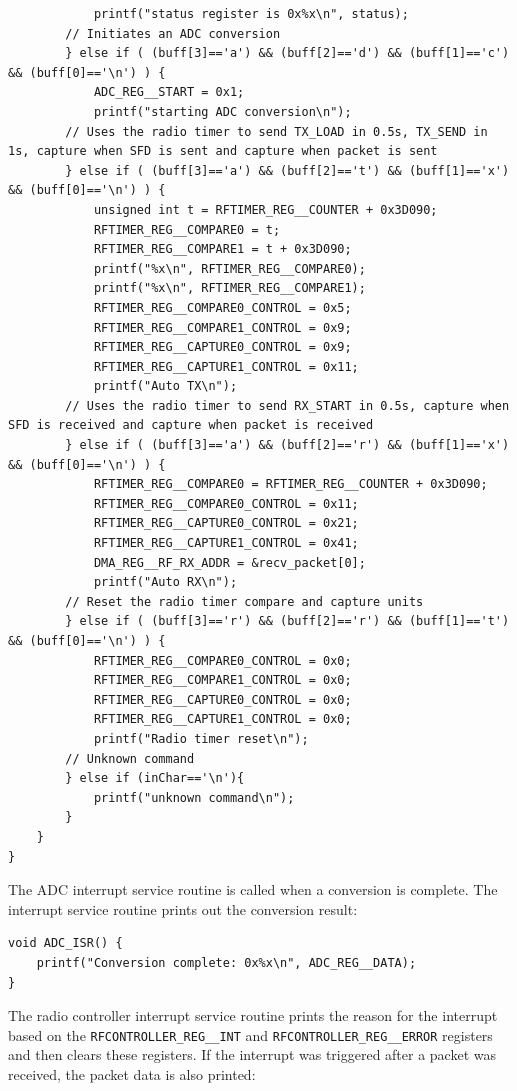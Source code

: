 \begin{lstlisting}
            printf("status register is 0x%x\n", status);	
        // Initiates an ADC conversion
        } else if ( (buff[3]=='a') && (buff[2]=='d') && (buff[1]=='c') && (buff[0]=='\n') ) {
            ADC_REG__START = 0x1;
            printf("starting ADC conversion\n");
        // Uses the radio timer to send TX_LOAD in 0.5s, TX_SEND in 1s, capture when SFD is sent and capture when packet is sent
        } else if ( (buff[3]=='a') && (buff[2]=='t') && (buff[1]=='x') && (buff[0]=='\n') ) {
            unsigned int t = RFTIMER_REG__COUNTER + 0x3D090;
            RFTIMER_REG__COMPARE0 = t;
            RFTIMER_REG__COMPARE1 = t + 0x3D090;
            printf("%x\n", RFTIMER_REG__COMPARE0);
            printf("%x\n", RFTIMER_REG__COMPARE1);
            RFTIMER_REG__COMPARE0_CONTROL = 0x5;
            RFTIMER_REG__COMPARE1_CONTROL = 0x9;
            RFTIMER_REG__CAPTURE0_CONTROL = 0x9;
            RFTIMER_REG__CAPTURE1_CONTROL = 0x11;
            printf("Auto TX\n");
        // Uses the radio timer to send RX_START in 0.5s, capture when SFD is received and capture when packet is received
        } else if ( (buff[3]=='a') && (buff[2]=='r') && (buff[1]=='x') && (buff[0]=='\n') ) {
            RFTIMER_REG__COMPARE0 = RFTIMER_REG__COUNTER + 0x3D090;
            RFTIMER_REG__COMPARE0_CONTROL = 0x11;
            RFTIMER_REG__CAPTURE0_CONTROL = 0x21;
            RFTIMER_REG__CAPTURE1_CONTROL = 0x41;
            DMA_REG__RF_RX_ADDR = &recv_packet[0];
            printf("Auto RX\n");
        // Reset the radio timer compare and capture units
        } else if ( (buff[3]=='r') && (buff[2]=='r') && (buff[1]=='t') && (buff[0]=='\n') ) {
            RFTIMER_REG__COMPARE0_CONTROL = 0x0;
            RFTIMER_REG__COMPARE1_CONTROL = 0x0;
            RFTIMER_REG__CAPTURE0_CONTROL = 0x0;
            RFTIMER_REG__CAPTURE1_CONTROL = 0x0;
            printf("Radio timer reset\n");
        // Unknown command
        } else if (inChar=='\n'){	
            printf("unknown command\n");		
        }
    }
}
\end{lstlisting}

The ADC interrupt service routine is called when a conversion is complete. The interrupt service routine prints out the conversion result:

\begin{lstlisting}
void ADC_ISR() {
    printf("Conversion complete: 0x%x\n", ADC_REG__DATA);
}
\end{lstlisting}

The radio controller interrupt service routine prints the reason for the interrupt based on the \texttt{RFCONTROLLER\_REG\_\_INT} and \texttt{RFCONTROLLER\_REG\_\_ERROR} registers and then clears these registers. If the interrupt was triggered after a packet was received, the packet data is also printed:

